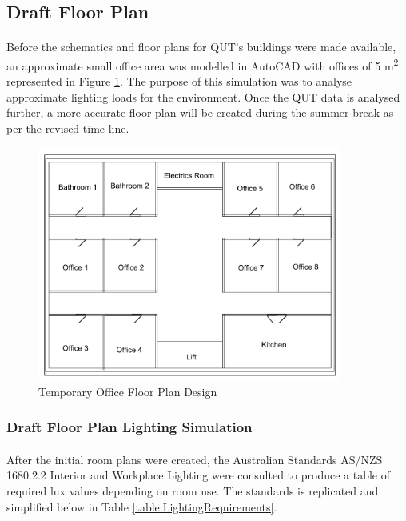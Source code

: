 \newpage
\subsection{Draft Floor Plan}

\paragraph{}
Before the schematics and floor plans for QUT's buildings were made available, an approximate small office area was modelled in AutoCAD with offices of 5 \si{m^2} represented in Figure \ref{fig:RoughFloorplan}. The purpose of this simulation was to analyse approximate lighting loads for the environment. Once the QUT data is analysed further, a more accurate floor plan will be created during the summer break as per the revised time line.    

\begin{figure}[H]
\hfill\includegraphics[width = 100mm]{images/Rough_Floorplan}\hspace*{\fill}
\caption{Temporary Office Floor Plan Design} 
\label{fig:RoughFloorplan}
\end{figure} 

\subsubsection{Draft Floor Plan Lighting Simulation}

\paragraph{}
After the initial room plans were created, the Australian Standards AS/NZS 1680.2.2 Interior and Workplace Lighting were consulted to produce a table of required lux values depending on room use. The standards is replicated and simplified below in Table \ref{table:LightingRequirements}.

